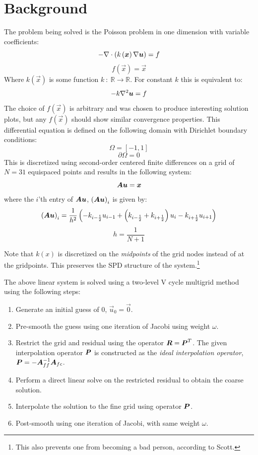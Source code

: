 


\section{Background}
The problem being solved is the Poisson problem in one dimension with variable coefficients:
$$ -\nabla \cdot \left(k\left(\bm{{x}}\right)\nabla\bm{{u}}\right) = f $$
$$ f(\vec{x}) = \vec{x} $$
Where $k\left(\vec{x}\right)$ is some function $k\: : \: \mathbb{R} \to \mathbb{R}$.  For constant $k$ this is equivalent to:
$$ -k\nabla^2\bm{{u}} = f $$
The choice of $f\left(\vec{x}\right)$ is arbitrary and was chosen to produce interesting solution plots, but any $f\left(\vec{x}\right)$ should show similar convergence properties.  This differential equation is defined on the following domain with Dirichlet boundary conditions:
$$ \Omega = \left[-1, 1\right]$$
$$ \partial\Omega = 0 $$
This is discretized using second-order centered finite differences on a grid of $N=31$ equispaced points and results in the following system:
$$ \bm{{A}}\bm{{u}} = \bm{{x}} $$
where the $i$'th entry of $\bm{{Au}}$, $\left(\bm{{Au}}\right)_i$ is given by:
$$\left(\bm{{Au}}\right)_i = \frac{1}{h^2} \left( -k_{i-\frac{1}{2}} u_{i-1} + \left(k_{i-\frac{1}{2}} + k_{i+\frac{1}{2}}\right)u_i - k_{i+\frac{1}{2}}u_{i+1} \right)$$
$$h = \frac{1}{N+1}$$

Note that $k\left(x\right)$ is discretized on the \textit{midpoints} of the grid nodes instead of at the gridpoints.  This preserves the SPD structure of the system.\footnote{This also prevents one from becoming a bad person, according to Scott.}


The above linear system is solved using a two-level V cycle multigrid method using the following steps:

\begin{enumerate}
\item Generate an initial guess of $0$, $\vec{u}_0 = \vec{0}$.
\item Pre-smooth the guess using one iteration of Jacobi using weight $\omega$.
\item Restrict the grid and residual using the operator $\bm{{R}}=\bm{{P}}^T$.  The given interpolation operator $\bm{{P}}$ is constructed as the \textit{ideal interpolation operator}, $\bm{{P}}=-\bm{{A}}_{ff}^{-1}\bm{{A}}_{fc}$.
\item Perform a direct linear solve on the restricted residual to obtain the coarse solution.
\item Interpolate the solution to the fine grid using operator $\bm{{P}}$.
\item Post-smooth using one iteration of Jacobi, with same weight $\omega$.
\end{enumerate}

